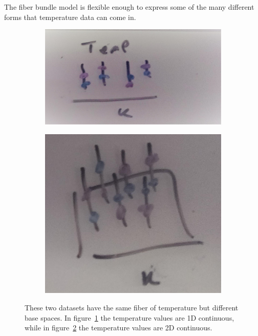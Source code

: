 \documentclass[../main.tex]{subfiles}
\begin{document}
The fiber bundle model is flexible enough to express some of the many different forms that temperature data can come in. 

\begin{figure}[ht!]
    \begin{subfigure}{.5\textwidth}
        \includegraphics[width=\textwidth]{figures/math/temp_1k.png}
        \label{fig:base_example_line}
    \end{subfigure}
    \begin{subfigure}{.5\textwidth}
        \includegraphics[width=\textwidth]{figures/math/temp_2k.png}
        \label{fig:base_example_plane}
    \end{subfigure}
    \label{fig:base_example}
    \caption{These two datasets have the same fiber of temperature but different base spaces. In figure~\ref{fig:base_example_line} the temperature values are 1D continuous, while in figure~\ref{fig:base_example_plane} the temperature values are 2D continuous.}
\end{figure}
\end{document}
